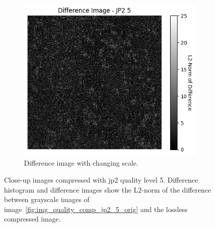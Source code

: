 \begin{figure}[htb]
\begin{subfigure}[b]{0.48\textwidth}
        \label{fig:img_quality_comp_jp2_5_center_diff}
    \end{subfigure}
    \begin{subfigure}[b]{0.48\textwidth}
        \centering
        \includegraphics[width=\textwidth]{doc/thesis/0_figures/compare_quality/set1/jp2_5_center_diff_heatmap_rel.png}
        \caption{Difference image with changing scale.}
        \label{fig:img_quality_comp_jp2_5_center_diff_rel}
    \end{subfigure}
    \caption{Close-up images compressed with \gls{jp2} quality level 5. Difference histogram and difference images show the L2-norm of the difference between grayscale images of image~\ref{fig:img_quality_comp_jp2_5_orig} and the lossless compressed image.}
    \label{fig:img_quality_comp_jp2_5_center}
\end{figure}

